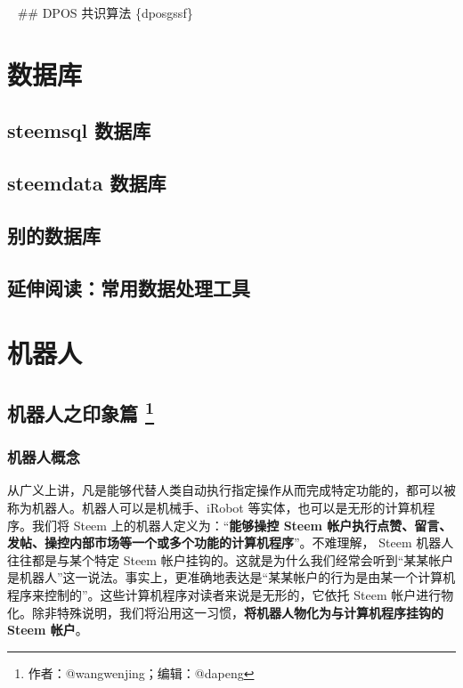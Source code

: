 \documentclass[]{ctexbook}
\begin{document}
~
\#\# DPOS 共识算法 \{dposgssf\}

\hypertarget{sjclp}{%
\chapter{数据库}\label{sjclp}}

\hypertarget{steemsql_sjk}{%
\section{steemsql 数据库}\label{steemsql_sjk}}

\hypertarget{steemdata_sjk}{%
\section{steemdata 数据库}\label{steemdata_sjk}}

\hypertarget{bdsjk}{%
\section{别的数据库}\label{bdsjk}}

\hypertarget{ysyd_cysjclgj}{%
\section{延伸阅读：常用数据处理工具}\label{ysyd_cysjclgj}}

\hypertarget{jqrp}{%
\chapter{机器人}\label{jqrp}}

\hypertarget{jqrzyxp}{%
\section[机器人之印象篇 ]{\texorpdfstring{机器人之印象篇 \footnote{作者：@wangwenjing；编辑：@dapeng}}{机器人之印象篇 }}\label{jqrzyxp}}

\hypertarget{jqrgn}{%
\subsection{机器人概念}\label{jqrgn}}

从广义上讲，凡是能够代替人类自动执行指定操作从而完成特定功能的，都可以被称为机器人。机器人可以是机械手、iRobot 等实体，也可以是无形的计算机程序。我们将 Steem 上的机器人定义为：``\textbf{能够操控 Steem 帐户执行点赞、留言、发帖、操控内部市场等一个或多个功能的计算机程序}''。不难理解， Steem 机器人往往都是与某个特定 Steem 帐户挂钩的。这就是为什么我们经常会听到``某某帐户是机器人''这一说法。事实上，更准确地表达是``某某帐户的行为是由某一个计算机程序来控制的''。这些计算机程序对读者来说是无形的，它依托 Steem 帐户进行物化。除非特殊说明，我们将沿用这一习惯，\textbf{将机器人物化为与计算机程序挂钩的 Steem 帐户}。
\end{document}

